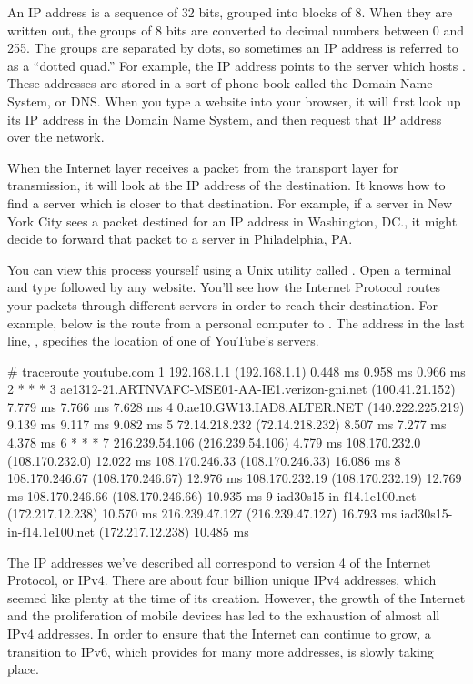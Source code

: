 An IP address is a sequence of 32 bits, grouped into blocks of 8. When they are written out, the groups of 8 bits are converted to decimal numbers between 0 and 255. The groups are separated by dots, so sometimes an IP address is referred to as a ``dotted quad.'' For example, the IP address  points to the server which hosts . These addresses are stored in a sort of phone book called the Domain Name System, or DNS. When you type a website into your browser, it will first look up its IP address in the Domain Name System, and then request that IP address over the network.

When the Internet layer receives a packet from the transport layer for transmission, it will look at the IP address of the destination. It knows how to find a server which is closer to that destination. For example, if a server in New York City sees a packet destined for an IP address in Washington, DC., it might decide to forward that packet to a server in Philadelphia, PA.

You can view this process yourself using a Unix utility called . Open a terminal and type  followed by any website. You'll see how the Internet Protocol routes your packets through different servers in order to reach their destination. For example, below is the route from a personal computer to . The address in the last line, , specifies the location of one of YouTube's servers.

\label{code:traceroute}
\begin{monospace}
# traceroute youtube.com
    1  192.168.1.1 (192.168.1.1)  0.448 ms  0.958 ms  0.966 ms
    2  * * *
    3  ae1312-21.ARTNVAFC-MSE01-AA-IE1.verizon-gni.net (100.41.21.152)  7.779 ms  7.766 ms  7.628 ms
    4  0.ae10.GW13.IAD8.ALTER.NET (140.222.225.219)  9.139 ms  9.117 ms  9.082 ms
    5  72.14.218.232 (72.14.218.232)  8.507 ms  7.277 ms  4.378 ms
    6  * * *
    7  216.239.54.106 (216.239.54.106)  4.779 ms 108.170.232.0 (108.170.232.0)  12.022 ms 108.170.246.33 (108.170.246.33)  16.086 ms
    8  108.170.246.67 (108.170.246.67)  12.976 ms 108.170.232.19 (108.170.232.19)  12.769 ms 108.170.246.66 (108.170.246.66)  10.935 ms
    9  iad30s15-in-f14.1e100.net (172.217.12.238)  10.570 ms 216.239.47.127 (216.239.47.127)  16.793 ms iad30s15-in-f14.1e100.net (172.217.12.238)  10.485 ms
\end{monospace}

The IP addresses we've described all correspond to version 4 of the Internet Protocol, or IPv4. There are about four billion unique IPv4 addresses, which seemed like plenty at the time of its creation. However, the growth of the Internet and the proliferation of mobile devices has led to the exhaustion of almost all IPv4 addresses. In order to ensure that the Internet can continue to grow, a transition to IPv6, which provides for many more addresses, is slowly taking place.

